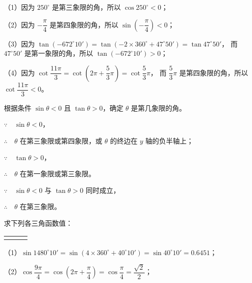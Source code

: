 \jie （1）因为 $250^\circ$ 是第三象限的角，所以 $\cos 250^\circ < 0$；

\vspace{0.5em}
（2）因为 $-\dfrac \pi 4$ 是第四象限的角，所以 $\sin \left(-\dfrac \pi 4 \right) < 0$；
\vspace{0.5em}

（3）因为 $\tan (-672^\circ 10') = \tan(-2 \times 360^\circ + 47^\circ 50') = \tan 47^\circ 50'$，
而 $47^\circ 50'$ 是第一象限的角，所以 $\tan (-672^\circ 10') > 0$；

\vspace{0.5em}
（4）因为 $\cot \dfrac{11\pi}{3} = \cot(2\pi + \dfrac 5 3 \pi) = \cot \dfrac 5 3 \pi$，
而 $\dfrac 5 3 \pi$ 是第四象限的角，所以 $\cot \dfrac{11\pi}{3} < 0$。
\vspace{0.5em}

\liti 根据条件 $\sin \theta < 0$ 且 $\tan \theta > 0$，确定 $\theta$ 是第几象限的角。

\jie $\because \quad \sin \theta < 0$，

$\therefore \quad \theta$ 在第三象限或第四象限，或 $\theta$ 的终边在 $y$ 轴的负半轴上；

$\because \quad \tan \theta > 0$，

$\therefore \quad \theta$ 在第一象限或第三象限。

$\because \quad \sin \theta < 0$ 与 $\tan \theta > 0$ 同时成立，

$\therefore \quad \theta$ 在第三象限。

\liti 求下列各三角函数值：
\begin{xiaoxiaotis}
    
    \vspace{0.5em}
    \begin{tabular}[t]{*{3}{@{}p{9em}}}
         & 
            & 
    \end{tabular}
    \vspace{0.5em}
    
\end{xiaoxiaotis}

\jie （1）$\sin 1480^\circ 10' = \sin(4 \times 360^\circ + 40^\circ 10') = \sin 40^\circ 10' = 0.6451$；

\vspace{0.5em}
（2）$\cos \dfrac{9\pi}{4} = \cos \left( 2\pi + \dfrac \pi 4 \right) = \cos \dfrac \pi 4 = \dfrac{\sqrt{2}}{2}$；
\vspace{0.5em}

